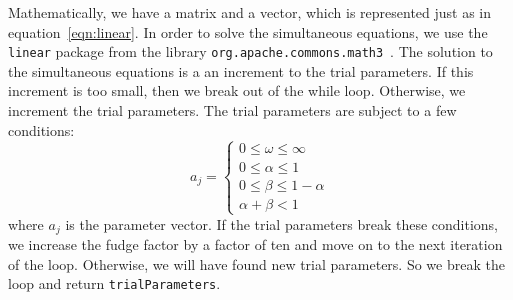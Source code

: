 \documentclass[../Dissertation.tex]{subfiles}
\begin{document}
Mathematically, we have a matrix and a vector, which is represented just as in equation~\ref{eqn:linear}.
In order to solve the simultaneous equations, we use the \lstinline|linear| package from the library \lstinline|org.apache.commons.math3|~\cite{Apache:Math3}.
The solution to the simultaneous equations is a an increment to the trial parameters.
If this increment is too small, then we break out of the while loop.
Otherwise, we increment the trial parameters.
The trial parameters are subject to a few conditions:
\begin{equation}
	\label{eqn:parameterconditions}
	a_j = \begin{cases}
		0 \leq \omega \leq \infty  \\
		0 \leq \alpha \leq 1       \\
		0 \leq \beta \leq 1-\alpha \\
		\alpha + \beta < 1
	\end{cases}
\end{equation}
where $a_j$ is the parameter vector.
If the trial parameters break these conditions, we increase the fudge factor by a factor of ten and move on to the next iteration of the loop.
Otherwise, we will have found new trial parameters.
So we break the loop and return \lstinline|trialParameters|.
\end{document}

